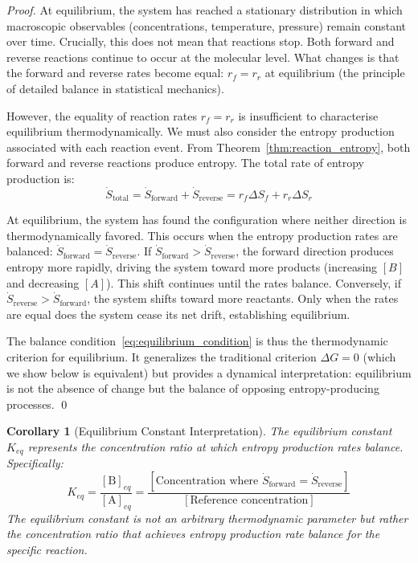 \documentclass[12pt,a4paper]{article}
\newtheorem{corollary}[theorem]{Corollary}
\theoremstyle{definition}
\theoremstyle{remark}
\begin{document}
\begin{proof}
At equilibrium, the system has reached a stationary distribution in which macroscopic observables (concentrations, temperature, pressure) remain constant over time. Crucially, this does not mean that reactions stop. Both forward and reverse reactions continue to occur at the molecular level. What changes is that the forward and reverse rates become equal: $r_f = r_r$ at equilibrium (the principle of detailed balance in statistical mechanics).

However, the equality of reaction rates $r_f = r_r$ is insufficient to characterise equilibrium thermodynamically. We must also consider the entropy production associated with each reaction event. From Theorem~\ref{thm:reaction_entropy}, both forward and reverse reactions produce entropy. The total rate of entropy production is:
\begin{equation}
\dot{S}_{\text{total}} = \dot{S}_{\text{forward}} + \dot{S}_{\text{reverse}} = r_f \Delta S_f + r_r \Delta S_r
\end{equation}

At equilibrium, the system has found the configuration where neither direction is thermodynamically favored. This occurs when the entropy production rates are balanced: $\dot{S}_{\text{forward}} = \dot{S}_{\text{reverse}}$. If $\dot{S}_{\text{forward}} > \dot{S}_{\text{reverse}}$, the forward direction produces entropy more rapidly, driving the system toward more products (increasing $[B]$ and decreasing $[A]$). This shift continues until the rates balance. Conversely, if $\dot{S}_{\text{reverse}} > \dot{S}_{\text{forward}}$, the system shifts toward more reactants. Only when the rates are equal does the system cease its net drift, establishing equilibrium.

The balance condition~\eqref{eq:equilibrium_condition} is thus the thermodynamic criterion for equilibrium. It generalizes the traditional criterion $\Delta G = 0$ (which we show below is equivalent) but provides a dynamical interpretation: equilibrium is not the absence of change but the balance of opposing entropy-producing processes. \qed
\end{proof}

\begin{corollary}[Equilibrium Constant Interpretation]
\label{cor:keq_interpretation}
The equilibrium constant $K_{eq}$ represents the concentration ratio at which entropy production rates balance. Specifically:
\begin{equation}
K_{eq} = \frac{[\text{B}]_{eq}}{[\text{A}]_{eq}} = \frac{[\text{Concentration where } \dot{S}_{\text{forward}} = \dot{S}_{\text{reverse}}]}{[\text{Reference concentration}]}
\label{eq:keq_entropy}
\end{equation}
The equilibrium constant is not an arbitrary thermodynamic parameter but rather the concentration ratio that achieves entropy production rate balance for the specific reaction.
\end{corollary}
\end{document}
